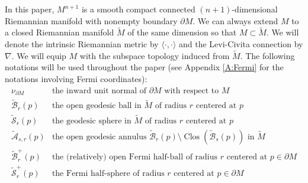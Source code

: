 \documentclass[10pt]{amsart}
\theoremstyle{definition}
\theoremstyle{remark}
\numberwithin{equation}{section}
\newcommand{\tM}{\widetilde{M}}
\newcommand{\tE}{\widetilde{\exp}}
\newcommand{\tBcal}{\widetilde{\mathcal{B}}}
\newcommand{\tAcal}{\widetilde{\mathcal{A}}}
\newcommand{\tScal}{\widetilde{\mathcal{S}}}
\newcommand{\Clos}{\operatorname{Clos}}
\begin{document}
In this paper, $M^{n+1}$ is a smooth compact connected $(n+1)$-dimensional Riemannian manifold with nonempty boundary $\partial M$. We can always extend $M$ to a closed Riemannian manifold $\tM$ of the same dimension \cite{Pigola-Veronelli16} so that $M \subset \tM$. We will denote the intrinsic Riemannian metric by $\langle \cdot, \cdot \rangle$ and the Levi-Civita connection by $\nabla$. 
We will equip $M$ with the subspace topology induced from $\tM$. 
The following notations will be used throughout the paper (see Appendix \ref{A:Fermi} for the notations involving Fermi coordinates):
\[ \begin{array}{cl}
\nu_{\partial M} & \text{the inward unit normal of $\partial M$ with respect to $M$}\\
\tBcal_r(p) & \text{the open geodesic ball in $\tM$ of radius $r$ centered at $p$} \\
\tScal_r(p) & \text{the geodesic sphere in $\tM$ of radius $r$ centered at $p$}\\
\tAcal_{s,r}(p) & \text{the open geodesic annulus $\tBcal_r(p) \setminus \Clos(\tBcal_s(p))$ in $\tM$} \\
\tBcal^+_r(p) & \text{the (relatively) open Fermi half-ball of radius $r$ centered at $p \in \partial M$} \\
\tScal^+_r(p) & \text{the Fermi half-sphere of radius $r$ centered at $p \in \partial M$}\\
\end{array} \]
\end{document}
